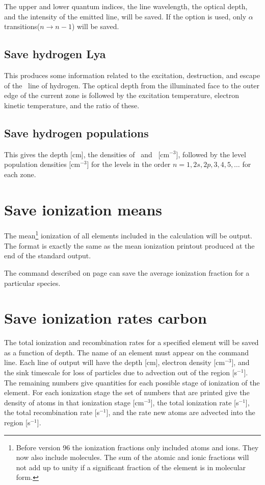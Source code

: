 The upper and lower quantum indices, the line wavelength, the optical
depth, and the intensity of the emitted line, will be saved. If the 
option is used, only $\alpha$ transitions($n\to n-1$) will be saved.

\subsection{Save hydrogen Lya}

This produces some information related to the excitation, destruction,
and escape of the \la\ line of hydrogen.  The optical depth from the
illuminated face to the outer edge of the current zone is followed by the
excitation temperature, electron kinetic temperature, and the ratio of these.

\subsection{Save hydrogen populations}

This gives the depth [cm], the densities of \hO\ and \hplus\ [cm$^{-3}$],
followed by the level population densities [cm$^{-3}$]
for the levels in the order $n = 1, 2s, 2p, 3, 4, 5,\dots$ for each zone.

\section{Save ionization means}
\label{sec:CommandSaveIonizationMeans} 

The mean\footnote{Before version 96 the ionization fractions only included atoms and
ions.  They now also include molecules.  The sum of the atomic and ionic
fractions will not add up to unity if a significant fraction of the element
is in molecular form.} ionization of all elements included in the calculation will
be output.  The format is exactly the same as the mean ionization printout
produced at the end of the standard output.

The  command described on
page \pageref{sec:CommandSaveAverage} can save
the average ionization fraction for a particular species.

\section{Save ionization rates carbon}

The total ionization and recombination rates for a specified element
will be saved as a function of depth.
The name of an element must appear
on the command line.
Each line of output will have the depth [cm], electron
density [cm$^{-3}$], and the sink timescale for loss of particles due to advection
out of the region [s$^{-1}$].
The remaining numbers give quantities for each
possible stage of ionization of the element.  For each ionization stage
the set of numbers that are printed give the density of atoms in that
ionization stage [cm$^{-3}$], the total ionization rate [s$^{-1}$],
the total recombination rate [s$^{-1}$], and the rate new atoms
are advected into the region [s$^{-1}$].

